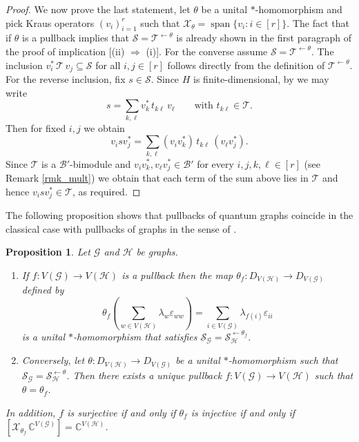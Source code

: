 \documentclass[11pt]{amsart}
\numberwithin{equation}{section}
\theoremstyle{plain}
\newtheorem{proposition}[theorem]{Proposition}
\theoremstyle{definition}
\theoremstyle{remark}
\newcommand{\B}{{\mathcal{B}}}
\newcommand{\G}{{\mathcal{G}}}
\renewcommand{\H}{{\mathcal{H}}}
\renewcommand{\S}{{\mathcal{S}}}
\newcommand{\T}{{\mathcal{T}}}
\newcommand{\X}{{\mathcal{X}}}
\newcommand{\eps}{\varepsilon}
\def\la{\lambda}
\newcommand{\bC}{\mathbb{C}}
\newcommand{\spn}{\operatorname{span}}
\begin{document}
\begin{proof}
We now prove the last statement, let $\theta$ be a unital $*$-homomorphism and pick Kraus operators $(v_i)_{i=1}^r$ such that $\X_{\theta} = \spn\{v_i: i\in [r]\}$. The fact that if $\theta$ is a pullback implies that $\S=\T^{\leftarrow \theta}$ is already shown in the first paragraph of the proof of implication [(ii) $\Rightarrow$ (i)]. For the converse assume $\S=\T^{\leftarrow \theta}$.
The inclusion $v_i^*\,\T\,v_j\subseteq \S$ for all $i,j \in [r]$ follows directly from the definition of $\T^{\leftarrow \theta}$.
For the reverse inclusion, fix $s\in\S$. Since $H$ is finite-dimensional, by \cite[Theorem 7.5]{Daws24} we may write
\[
s=\sum_{k,\ell} v_k^*\,t_{k\ell}\,v_\ell
\qquad\text{with } t_{k\ell}\in\T.
\]
Then for fixed $i,j$ we obtain
\[
v_i s v_j^*
=\sum_{k,\ell} (v_iv_k^*)\,t_{k\ell}\,(v_\ell v_j^*).
\]
Since $\T$ is a $\B'$-bimodule and $v_iv_k^*,v_\ell v_j^*\in \B'$ for every $i,j,k,\ell \in [r]$ (see Remark \ref{rmk_mult}) we obtain that
each term of the sum above lies in $\T$ and hence $v_i s v_j^*\in\T$, as required.  
\end{proof}

The following proposition shows that pullbacks of quantum graphs coincide in the classical case with pullbacks of graphs in the sense of \cite{EKT21}.

\begin{proposition}\label{prop:classical-weaver-pullback}
Let $\G$ and $\H$ be graphs.
\begin{enumerate}
\item
If $f \colon V(\G)\to V(\H)$ is a pullback then the map $\theta_f \colon D_{V(\H)} \to D_{V(\G)}$ defined by
\[
\theta_f(\sum_{w\in V(\H)}\la_{w} \eps_{ww})
= \sum _{i \in V(\G)} \lambda_{f(i)} \eps_{ii}
\]
is a unital $*$-homomorphism that satisfies $\S_\G=\S_\H^{\leftarrow\theta_f}$.

\item Conversely, let $\theta \colon D_{V(\H)}\to D_{V(\G)}$ be a unital $*$-homomorphism such that $\S_\G=\S_\H^{\leftarrow\theta}$.
Then there exists a unique pullback $f\colon V(\G)\to V(\H)$ such that $\theta=\theta_f$. 
\end{enumerate}

In addition, $f$ is surjective if and only if $\theta_f$ is injective if and only if $[\X_{\theta_f} \,\bC^{V(\G)} ]= \bC^{V(\H)}$.
\end{proposition}
\end{document}
